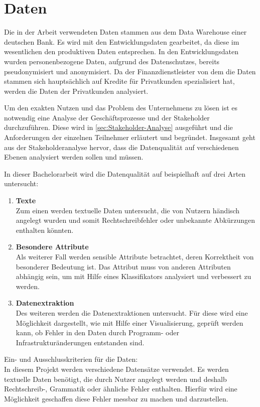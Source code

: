 \chapter{Daten}\label{ch:data}
Die in der Arbeit verwendeten Daten stammen aus dem Data Warehouse einer deutschen Bank.
Es wird mit den Entwicklungsdaten gearbeitet, da diese im wesentlichen den produktiven Daten entsprechen.
In den Entwicklungsdaten wurden personenbezogene Daten, aufgrund des Datenschutzes, bereits pseudonymisiert und anonymisiert.
Da der Finanzdienstleister von dem die Daten stammen sich hauptsächlich auf Kredite für Privatkunden spezialisiert hat, werden die Daten der Privatkunden analysiert.

Um den exakten Nutzen und das Problem des Unternehmens zu lösen ist es notwendig eine Analyse der Geschäftsprozesse und der Stakeholder durchzuführen. 
Diese wird in \autoref{sec:Stakeholder-Analyse} ausgeführt und die Anforderungen der einzelnen Teilnehmer erläutert und begründet.
Insgesamt geht aus der Stakeholderanalyse hervor, dass die Datenqualität auf verschiedenen Ebenen analysiert werden sollen und müssen. 

In dieser Bachelorarbeit wird die Datenqualität auf beispielhaft auf drei Arten untersucht:
\begin{enumerate}
 \item \textbf{Texte} \\
 Zum einen werden textuelle Daten untersucht, die von Nutzern händisch angelegt wurden und somit Rechtschreibfehler oder unbekannte Abkürzungen enthalten könnten. 
 \item \textbf{Besondere Attribute} \\
 Als weiterer Fall werden sensible Attribute betrachtet, deren Korrektheit von besonderer Bedeutung ist. Das Attribut muss von anderen Attributen abhängig sein, um mit Hilfe eines Klassifikators analysiert und verbessert zu werden.  %
 \item \textbf{Datenextraktion} \\
 Des weiteren werden die Datenextraktionen untersucht. Für diese wird eine Möglichkeit dargestellt, wie mit Hilfe einer Visualisierung, geprüft werden kann, ob Fehler in den Daten durch Programm- oder Infrastrukturänderungen entstanden sind. 
\end{enumerate}



Ein- und Ausschlusskriterien für die Daten:\\
In diesem Projekt werden verschiedene Datensätze verwendet. 
Es werden textuelle Daten benötigt, die durch Nutzer angelegt werden und deshalb Rechtschreib-, Grammatik oder ähnliche Fehler enthalten. 
Hierfür wird eine Möglichkeit geschaffen diese Fehler messbar zu machen und darzustellen. \\ 

